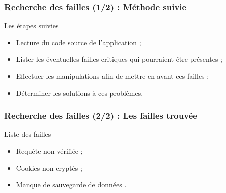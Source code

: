 \begin{frame}
	\frametitle{Recherche des failles (1/2) : Méthode suivie}

	\begin{block}{Les étapes suivies}
		\begin{itemize}
			\item Lecture du code source de l’application ;
			\item Lister les éventuelles failles critiques qui pourraient être présentes ;
			\item Effectuer les manipulations afin de mettre en avant ces failles ;
			\item Déterminer les solutions à ces problèmes.
		\end{itemize}
	\end{block}
\end{frame}

\begin{frame}
	\frametitle{Recherche des failles (2/2) : Les failles trouvée}

	\begin{block}{Liste des failles}
	 \begin{itemize}
      \item Requête non vérifiée ;
	  \item Cookies non cryptés ;
	  \item Manque de sauvegarde de données .
	 \end{itemize}
	\end{block}
\end{frame}